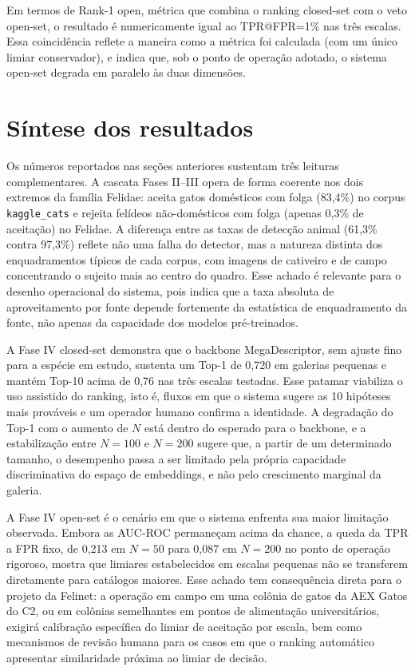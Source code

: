 Em termos de Rank-1 open, métrica que combina o ranking closed-set com o veto open-set, o resultado é numericamente igual ao TPR@FPR=1\% nas três escalas. Essa coincidência reflete a maneira como a métrica foi calculada (com um único limiar conservador), e indica que, sob o ponto de operação adotado, o sistema open-set degrada em paralelo às duas dimensões.

\section{Síntese dos resultados}
\label{sec:res-sintese}

Os números reportados nas seções anteriores sustentam três leituras complementares. A cascata Fases II--III opera de forma coerente nos dois extremos da família Felidae: aceita gatos domésticos com folga (83,4\%) no corpus \texttt{kaggle\_cats} e rejeita felídeos não-domésticos com folga (apenas 0,3\% de aceitação) no Felidae. A diferença entre as taxas de detecção animal (61,3\% contra 97,3\%) reflete não uma falha do detector, mas a natureza distinta dos enquadramentos típicos de cada corpus, com imagens de cativeiro e de campo concentrando o sujeito mais ao centro do quadro. Esse achado é relevante para o desenho operacional do sistema, pois indica que a taxa absoluta de aproveitamento por fonte depende fortemente da estatística de enquadramento da fonte, não apenas da capacidade dos modelos pré-treinados.

A Fase IV closed-set demonstra que o backbone MegaDescriptor, sem ajuste fino para a espécie em estudo, sustenta um Top-1 de 0,720 em galerias pequenas e mantém Top-10 acima de 0,76 nas três escalas testadas. Esse patamar viabiliza o uso assistido do ranking, isto é, fluxos em que o sistema sugere as 10 hipóteses mais prováveis e um operador humano confirma a identidade. A degradação do Top-1 com o aumento de $N$ está dentro do esperado para o backbone, e a estabilização entre $N=100$ e $N=200$ sugere que, a partir de um determinado tamanho, o desempenho passa a ser limitado pela própria capacidade discriminativa do espaço de embeddings, e não pelo crescimento marginal da galeria.

A Fase IV open-set é o cenário em que o sistema enfrenta sua maior limitação observada. Embora as AUC-ROC permaneçam acima da chance, a queda da TPR a FPR fixo, de 0,213 em $N=50$ para 0,087 em $N=200$ no ponto de operação rigoroso, mostra que limiares estabelecidos em escalas pequenas não se transferem diretamente para catálogos maiores. Esse achado tem consequência direta para o projeto da Felinet: a operação em campo em uma colônia de gatos da AEX Gatos do C2, ou em colônias semelhantes em pontos de alimentação universitários, exigirá calibração específica do limiar de aceitação por escala, bem como mecanismos de revisão humana para os casos em que o ranking automático apresentar similaridade próxima ao limiar de decisão.

